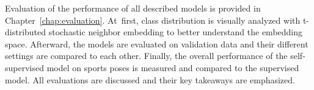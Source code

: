 Evaluation of the performance of all described models is provided in Chapter~\ref{chap:evaluation}. At~first, class distribution is visually analyzed with t-distributed stochastic neighbor embedding to better understand the embedding space. Afterward, the models are evaluated on validation data and their different settings are compared to each other. Finally, the overall performance of the self-supervised model on sports poses is measured and compared to the supervised model. All evaluations are discussed and their key takeaways are emphasized.
